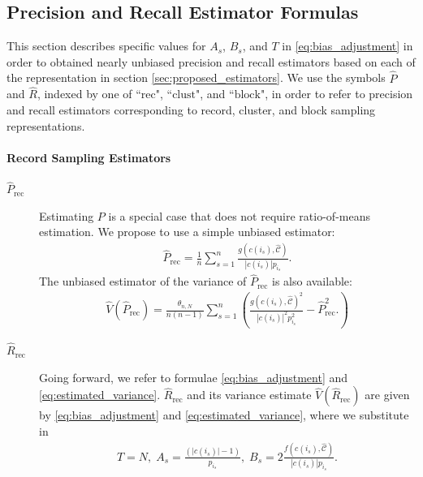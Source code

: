 \documentclass[fontsize=11pt]{article}
\theoremstyle{definition}
\begin{document}
\subsection{Precision and Recall Estimator Formulas}

This section describes specific values for $A_s$, $B_s$, and $T$ in \eqref{eq:bias_adjustment} in order to obtained nearly unbiased precision and recall estimators based on each of the representation in section \ref{sec:proposed_estimators}. We use the symbols $\widehat P$ and $\widehat R$, indexed by one of ``$\text{rec}$", ``$\text{clust}$", and ``$\text{block}$", in order to refer to precision and recall estimators corresponding to record, cluster, and block sampling representations.

\paragraph{Record Sampling Estimators}

\begin{description}
    \item[$\widehat{P}_{\text{rec}}$]{Estimating $P$ is a special case that does not require ratio-of-means estimation. We propose to use a simple unbiased estimator:}
    \begin{align}\label{eq:P_rec}
        \widehat{P}_{\text{rec}} =
        \frac{1}{n}\sum_{s=1}^{n}\frac{g(c(i_s),\widehat{\mathcal{C}})}{|c(i_s)|p_{i_s}}.
    \end{align}
    The unbiased estimator of the variance of $\widehat{P}_{\text{rec}}$ is also available:
    \begin{align}
        \widehat{V}(\widehat{P}_{\text{rec}}) = 
        \frac{\theta_{n,N}}{n(n-1)}\sum_{s=1}^{n}\left(
        \frac{g(c(i_s),\widehat{\mathcal{C}})^2}{|c(i_s)|^2p_{i_s}^2} - 
        \widehat{P}_{\text{rec}}^2.
        \right)
    \end{align}
    \item[$\widehat{R}_{\text{rec}}$]{Going forward, we refer to formulae \eqref{eq:bias_adjustment} and \eqref{eq:estimated_variance}. $\widehat{R}_{\text{rec}}$ and its variance estimate $\widehat{V}(\widehat{R}_{\text{rec}})$ are given by \eqref{eq:bias_adjustment} and \eqref{eq:estimated_variance}, where we substitute in}
    \begin{align}
    T = N,\; A_s = \frac{(\lvert c(i_s) \rvert - 1)}{p_{i_s}},\; 
    B_s = 2\frac{f(c(i_s),\widehat{\mathcal{C}})}{|c(i_s)|p_{i_s}}.
    \end{align}
\end{description}
\end{document}

